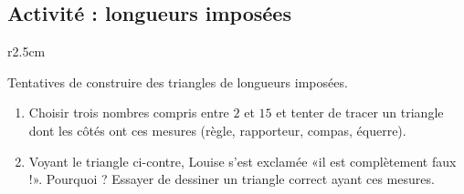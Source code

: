 
\subsection*{Activité : longueurs imposées}

\begin{wrapfigure}{r}{2.5cm}
   \vspace{-0.5cm}        %
   \centering
   
\end{wrapfigure}

Tentatives de construire des triangles de longueurs imposées.

\begin{enumerate}
    \item
        
Choisir trois nombres compris entre $2$ et $15$ et tenter de tracer un triangle dont les côtés ont ces mesures (règle, rapporteur, compas, équerre).

\item

    Voyant le triangle ci-contre, Louise s'est exclamée «il est complètement faux !». Pourquoi ? Essayer de dessiner un triangle correct ayant ces mesures.

\end{enumerate}
